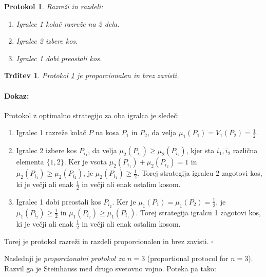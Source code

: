 \documentclass[a4paper, 12pt]{article}
\newtheorem{trditev}{Trditev}
\newtheorem{protokol}{Protokol}
\newenvironment{dokaz}{\paragraph{Dokaz:}}{\hfill$\square$\\}
\begin{document}
	\begin{protokol} 
		\label{razrezi&razdeli}
		Razreži in razdeli:
		\begin{enumerate}
			
			\item Igralec 1 kolač razreže na 2 dela.
			
			\item Igralec 2 izbere kos.
			
			\item Igralec 1 dobi preostali kos.
			
		\end{enumerate}
	\end{protokol}
	
	\begin{trditev}
		Protokol \ref{razrezi&razdeli} je proporcionalen in brez zavisti.
	\end{trditev}

	\begin{dokaz}
		Protokol z optimalno strategijo za oba igralca je sledeč:
		\begin{enumerate}
			
			\item Igralec 1 razreže kolač $P$ na kosa $P_1$ in $P_2$, da velja $\mu_1 (P_1) = V_1 (P_2) = \frac{1}{2}$.
			
			\item Igralec 2 izbere kos $P_{i_1}$, da velja $\mu_2 (P_{i_1}) \geq \mu_2 (P_{i_2})$, kjer sta $i_1, i_2$ različna elementa $\{1, 2\}$. Ker je vsota $\mu_2 (P_{i_1}) + \mu_2 (P_{i_2}) = 1$ in $\mu_2 (P_{i_1}) \geq \mu_2 (P_{i_2})$, je $\mu_2 (P_{i_1}) \geq \frac{1}{2}$. Torej strategija igralcu 2 zagotovi kos, ki je večji ali enak $\frac{1}{2}$ in večji ali enak ostalim kosom.
			
			\item Igralec 1 dobi preostali kos $P_{i_2}$. Ker je $\mu_1 (P_1) = \mu_1 (P_2) = \frac{1}{2}$, je $\mu_1 (P_{i_2}) \geq \frac{1}{2}$ in $\mu_1 (P_{i_2}) \geq \mu_1 (P_{i_1})$. Torej strategija igralcu 1 zagotovi kos, ki je večji ali enak $\frac{1}{2}$ in večji ali enak ostalim kosom.
			
		\end{enumerate}
	
		Torej je protokol razreži in razdeli proporcionalen in brez zavisti.
	\end{dokaz}

	Naslednji je \textit{proporcionalni protokol za $n = 3$} (proportional protocol for $n=3$). Razvil ga je Steinhauss med drugo svetovno vojno. Poteka pa tako:
	
\end{document}
